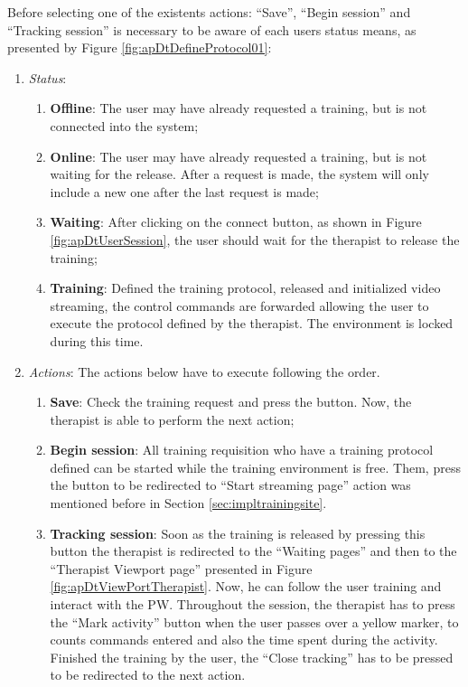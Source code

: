 Before selecting one of the existents actions: ``Save'', ``Begin session'' and ``Tracking session'' is  necessary to be aware of  each users status means, as presented by Figure \ref{fig:apDtDefineProtocol01}:

\begin{enumerate}
\item \textit{Status}:
\begin{enumerate}[label=(\alph*)]
\item \textbf{Offline}: The user may have already requested a training, but is not connected into the system;
\item \textbf{Online}: The user may have already requested a training, but is not waiting for the release. After a request is made, the system will only include a new one after the last request is made;
\item \textbf{Waiting}: After clicking on the connect button, as shown in Figure \ref{fig:apDtUserSession}, the user should wait for the therapist to release the training;
\item \textbf{Training}: Defined the training protocol, released and initialized video streaming, the control commands are forwarded allowing the user to execute the protocol defined by the therapist. The environment is locked during this time.
\end{enumerate} 
\item \textit{Actions}: The actions below have to execute following the order.
\begin{enumerate}[label=(\alph*)]
\item \textbf{Save}: Check the training request and press the button. Now, the therapist is able to perform the next action;
\item \textbf{Begin session}: All training requisition who have a training protocol defined can be started while the training environment is free. Them, press the button to be redirected to ``Start streaming page'' action was mentioned before in Section \ref{sec:impltrainingsite}. 
\item \textbf{Tracking session}: Soon as the training is released by pressing this button the therapist is redirected to the ``Waiting pages'' and then to the ``Therapist Viewport page'' presented in Figure \ref{fig:apDtViewPortTherapist}. Now, he can follow the user training and interact with the PW. Throughout the session, the therapist has to press the ``Mark activity'' button when the user passes over a yellow marker,  to counts commands entered and also the time spent during the activity. Finished the training by the user,  the ``Close tracking'' has to be pressed to be redirected to the next action.
\end{enumerate} 
\end{enumerate}

